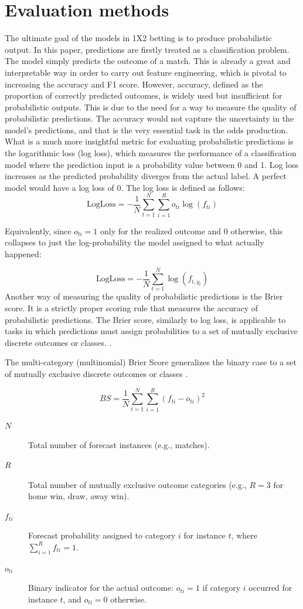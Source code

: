 \documentclass{article}
\begin{document}
\section{Evaluation methods}
The ultimate goal of the models in 1X2 betting is to produce probabilistic output. In this paper, predictions are firstly treated as a classification problem. The model simply predicts the outcome of a match. This is already a great and interpretable way in order to carry out feature engineering, which is pivotal to increasing the accuracy and F1 score. However, accuracy, defined as the proportion of correctly predicted outcomes, is widely used but insufficient for probabilistic outputs\cite{MLeval}. This is due to the need for a way to measure the quality of probabilistic predictions. The accuracy would not capture the uncertainty in the model's predictions, and that is the very essential task in the odds production. What is a much more insightful metric for evaluating probabilistic predictions is the logarithmic loss (log loss), which measures the performance of a classification model where the prediction input is a probability value between 0 and 1. Log loss increases as the predicted probability diverges from the actual label. A perfect model would have a log loss of 0. The log loss is defined as follows:
$$\text{LogLoss} = -\frac{1}{N} \sum_{t=1}^{N} \sum_{i=1}^{R} o_{ti} \log(f_{ti})$$

Equivalently, since $o_{ti}=1$ only for the realized outcome and 0 otherwise, this collapses to just the log-probability the model assigned to what actually happened:

$$\text{LogLoss} = -\frac{1}{N} \sum_{t=1}^{N} \log(f_{t, y_t})$$
Another way of measuring the quality of probabilistic predictions is the Brier score. It is a strictly proper scoring rule that measures the accuracy of probabilistic predictions. The Brier score, similarly to log loss, is applicable to tasks in which predictions must assign probabilities to a set of mutually exclusive discrete outcomes or classes. \cite{wiki:Brier}. 

The multi-category (multinomial) Brier Score generalizes the binary case to a set of mutually exclusive discrete outcomes or classes \cite{wiki:Brier}.

\begin{equation}
BS = \frac{1}{N} \sum_{t=1}^{N} \sum_{i=1}^{R} \left( f_{ti} - o_{ti} \right)^2
\end{equation}

\begin{description}
    \item[$N$] Total number of forecast instances (e.g., matches).
    \item[$R$] Total number of mutually exclusive outcome categories (e.g., $R=3$ for home win, draw, away win).
    \item[$f_{ti}$] Forecast probability assigned to category $i$ for instance $t$, where $\sum_{i=1}^{R} f_{ti} = 1$.
    \item[$o_{ti}$] Binary indicator for the actual outcome: $o_{ti} = 1$ if category $i$ occurred for instance $t$, and $o_{ti} = 0$ otherwise.
\end{description}
\end{document}
